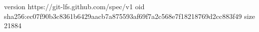 version https://git-lfs.github.com/spec/v1
oid sha256:ec07f90b3c8361b6429aacb7a875593af69f7a2c568e7f18218769d2cc883f49
size 21884

